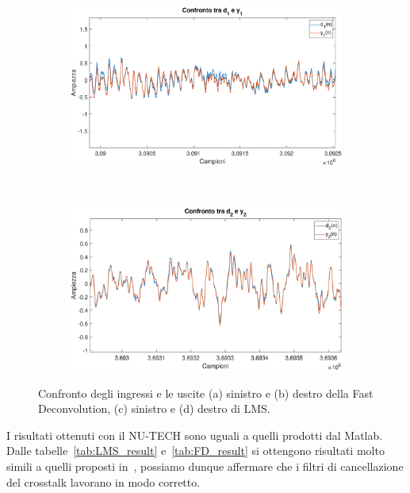 \documentclass[12pt,a4paper,titlepage]{article}
\begin{document}
\begin{figure}[h]
	\ContinuedFloat
	\centering
	\begin{subfigure}{1\textwidth}
		\includegraphics[width=1\textwidth]{Immagini/d1_y1_LMS}
		\caption{}
		\label{fig:d1_y1_LMS}
	\end{subfigure}\\
	\begin{subfigure}{1\textwidth}
		\includegraphics[width=1\textwidth]{Immagini/d2_y2_LMS}
		\caption{}
		\label{fig:d2_y2_LMS}
	\end{subfigure}
	\caption{Confronto degli ingressi e le uscite (a) sinistro e (b) destro della Fast Deconvolution, (c) sinistro e (d) destro di LMS.}
	\label{fig:confronto_ingressi_uscite_LMS_FD}
\end{figure}

I risultati ottenuti con il NU-TECH sono uguali a quelli prodotti dal Matlab. Dalle tabelle~\ref{tab:LMS_result} e~\ref{tab:FD_result} si ottengono risultati molto simili a quelli proposti in~\cite{Li:comprehensive_comparison}, possiamo dunque affermare che i filtri di cancellazione del crosstalk lavorano in modo corretto.

\clearpage

\nocite{*}
\printbibliography
\end{document}
